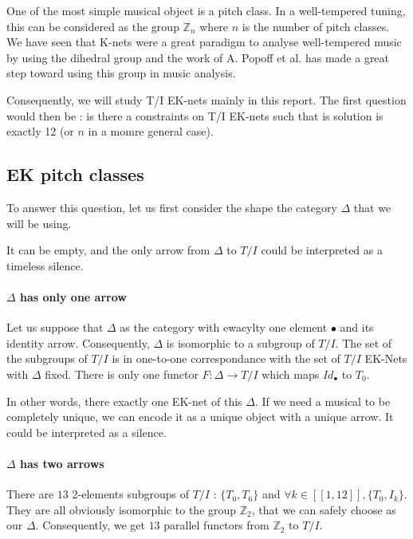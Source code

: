 One of the most simple musical object is a pitch class. In a well-tempered tuning, this can be considered as the group $\mathbb{Z}_n$ where $n$ is the number of pitch classes. We have seen that K-nets were a great paradigm to analyse well-tempered music by using the dihedral group and the work of  A. Popoff et al.\cite{PAAE2016} has made a great step toward using this group in music analysis.

Consequently, we will study T/I EK-nets mainly in this report. The first question would then be : is there a constraints on T/I EK-nets such that is solution is exactly 12 (or $n$ in a momre general case).

\subsection{EK pitch classes}

To answer this question, let us first consider the shape the category $\Delta$ that we will be using.

It can be empty, and the only arrow from $\Delta$ to $T/I$ could be interpreted as a timeless silence.

\paragraph{$\Delta$ has only one arrow}
Let us suppose that $\Delta$ as the category with ewacylty one element $\bullet$ and its identity arrow. Consequently, $\Delta$ is isomorphic to a subgroup of $T/I$. The set of the subgroups of $T/I$ is in one-to-one correspondance with the set of $T/I$ EK-Nets with $\Delta$ fixed.
There is only one functor $F:\Delta \rightarrow T/I$ which maps $Id_\bullet$ to $T_0$.

In other words, there exactly one EK-net of this $\Delta$. If we need a musical to be completely unique, we can encode it as a unique object with a unique arrow. It could be interpreted as a silence.



\paragraph{$\Delta$ has two arrows}
There are $13$ 2-elements subgroups of $T/I$ : $\{T_0,T_6\}$ and $\forall k\in[\![1,12]\!], \{T_0,I_k\}$. They are all obviously isomorphic to the group $\mathbb{Z}_2$, that we can safely choose as our $\Delta$. Consequently, we get $13$ parallel functors from $\mathbb{Z}_2$ to $T/I$.

